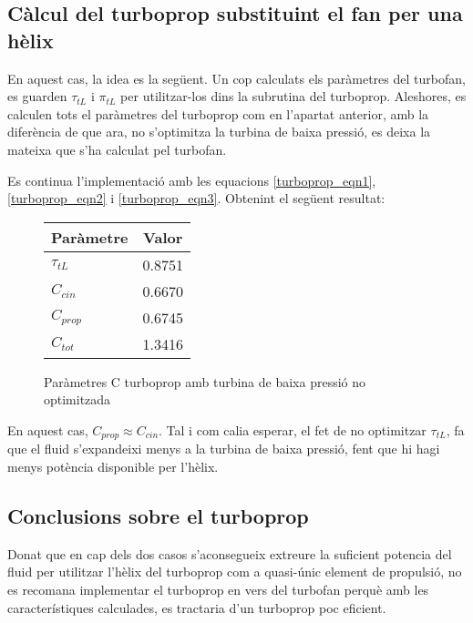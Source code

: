 \subsection{Càlcul del turboprop substituint el fan per una hèlix}
En aquest cas, la idea es la següent. Un cop calculats els paràmetres del turbofan, es guarden $\tau_{tL}$ i $\pi_{tL}$  per utilitzar-los dins la subrutina del turboprop. Aleshores, es calculen tots el paràmetres del turboprop com en l'apartat anterior, amb la diferència de que ara, no s'optimitza la turbina de baixa pressió, es deixa la mateixa que s'ha calculat pel turbofan.

\noindent Es continua l'implementació amb les equacions \ref{turboprop_eqn1}, \ref{turboprop_eqn2} i \ref{turboprop_eqn3}. Obtenint el següent resultat:
\begin{figure}[H]
	\centering
	\begin{tabular}{lc}
		\toprule[3pt]
		\textbf{Paràmetre}&\textbf{Valor}\\
		\midrule[1pt]
		$\tau_{tL}$ & 0.8751\\
		$C_{cin}$ & 0.6670\\
		$C_{prop}$ & 0.6745\\
		$C_{tot}$ & 1.3416\\
		
		\bottomrule[2pt]
	\end{tabular}
	\label{C_opti2}
	\caption{Paràmetres C turboprop amb turbina de baixa pressió no optimitzada}
\end{figure}
\noindent En aquest cas, $C_{prop}\approx C_{cin}$. Tal i com calia esperar, el fet de no optimitzar $\tau_{tL}$, fa que el fluid s'expandeixi menys a la turbina de baixa pressió, fent que hi hagi menys potència disponible per l'hèlix.

\subsection{Conclusions sobre el turboprop}
Donat que en cap dels dos casos s'aconsegueix extreure la suficient potencia del fluid per utilitzar l'hèlix del turboprop com a quasi-únic element de propulsió, no es recomana implementar el turboprop en vers del turbofan perquè amb les característiques calculades, es tractaria d'un turboprop poc eficient.


\clearpage